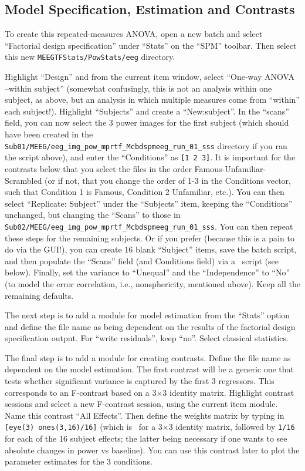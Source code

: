 \subsection{Model Specification, Estimation and Contrasts}

To create this repeated-measures ANOVA, open a new batch and select ``Factorial design specification'' under ``Stats'' on the ``SPM'' toolbar. Then select this new \texttt{MEEGTFStats/PowStats/eeg} directory.

Highlight ``Design'' and from the current item window, select ``One-way ANOVA --within subject'' (somewhat confusingly, this is not an analysis within one subject, as above, but an analysis in which multiple measures come from ``within'' each subject!). Highlight ``Subjects'' and create a ``New:subject''. In the ``scans'' field, you can now select the 3 power images for the first subject (which should have been created in the \texttt{Sub01/MEEG/eeg\_img\_pow\_mprtf\_Mcbdspmeeg\_run\_01\_sss} directory if you ran the script above), and enter the ``Conditions'' as \texttt{[1 2 3]}. It is important for the contrasts below that you select the files in the order Famous-Unfamiliar-Scrambled (or if not, that you change the order of 1-3 in the Conditions vector, such that Condition 1 is Famous, Condition 2 Unfamiliar, etc.). You can then select ``Replicate: Subject'' under the ``Subjects'' item, keeping the ``Conditions'' unchanged, but changing the ``Scans'' to those in \texttt{Sub02/MEEG/eeg\_img\_pow\_mprtf\_Mcbdspmeeg\_run\_01\_sss}. You can then repeat these steps for the remaining subjects. Or if you prefer (because this is a pain to do via the GUI!), you can create 16 blank ``Subject'' items, save the batch script, and then populate the ``Scans'' field (and Conditions field) via a \matlab\ script (see below). Finally, set the variance to ``Unequal'' and the ``Independence'' to ``No'' (to model the error correlation, i.e., nonsphericity, mentioned above). Keep all the remaining defaults. 

The next step is to add a module for model estimation from the ``Stats'' option and define the file name as being dependent on the results of the factorial design specification output. For ``write residuals'', keep ``no''. Select classical statistics. 

The final step is to add a module for creating contrasts. Define the file name as dependent on the model estimation. The first contrast will be a generic one that tests whether significant variance is captured by the first 3 regressors. This corresponds to an F-contrast based on a 3\(\times\)3 identity matrix. Highlight contrast sessions and select a new F-contrast session, using the current item module. Name this contrast ``All Effects''. Then define the weights matrix by typing in \texttt{[eye(3) ones(3,16)/16]} (which is \matlab\ for a 3\(\times\)3 identity matrix, followed by \texttt{1/16} for each of the 16 subject effects; the latter being necessary if one wants to see absolute changes in power vs baseline). You can use this contrast later to plot the parameter estimates for the 3 conditions.

